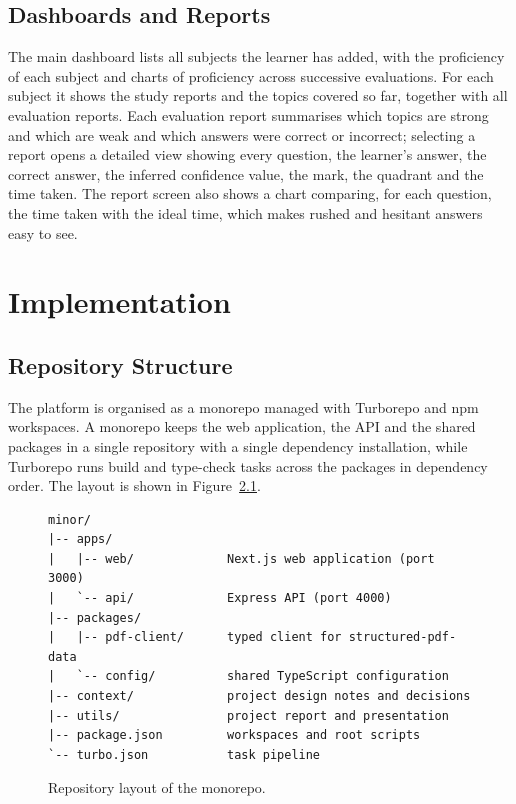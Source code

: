 \documentclass[12pt,a4paper,oneside]{report}
\begin{document}
\section{Dashboards and Reports}

The main dashboard lists all subjects the learner has added, with the
proficiency of each subject and charts of proficiency across successive
evaluations. For each subject it shows the study reports and the topics
covered so far, together with all evaluation reports. Each evaluation
report summarises which topics are strong and which are weak and which
answers were correct or incorrect; selecting a report opens a detailed
view showing every question, the learner's answer, the correct answer,
the inferred confidence value, the mark, the quadrant and the time taken.
The report screen also shows a chart comparing, for each question, the
time taken with the ideal time, which makes rushed and hesitant answers
easy to see.

\chapter{Implementation}\label{ch:impl}

\section{Repository Structure}

The platform is organised as a monorepo managed with Turborepo
\cite{turborepo} and npm workspaces. A monorepo keeps the web application,
the API and the shared packages in a single repository with a single
dependency installation, while Turborepo runs build and type-check tasks
across the packages in dependency order. The layout is shown in
Figure~\ref{fig:repo}.

\begin{figure}[H]
\centering
\begin{minipage}{0.85\textwidth}
\small
\begin{verbatim}
minor/
|-- apps/
|   |-- web/             Next.js web application (port 3000)
|   `-- api/             Express API (port 4000)
|-- packages/
|   |-- pdf-client/      typed client for structured-pdf-data
|   `-- config/          shared TypeScript configuration
|-- context/             project design notes and decisions
|-- utils/               project report and presentation
|-- package.json         workspaces and root scripts
`-- turbo.json           task pipeline
\end{verbatim}
\end{minipage}
\caption{Repository layout of the monorepo.}
\label{fig:repo}
\end{figure}
\end{document}
